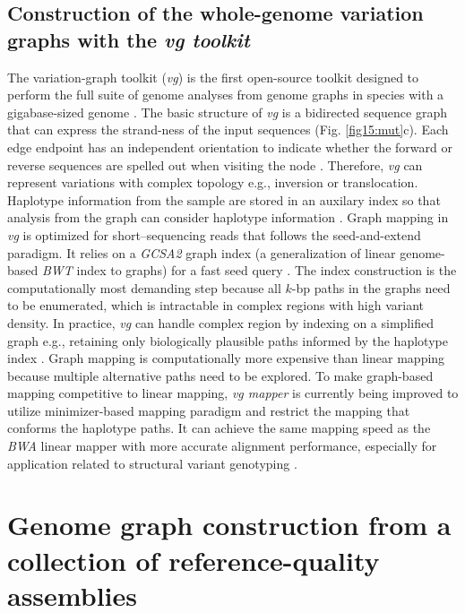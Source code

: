 \documentclass[../main.tex]{subfiles}
\begin{document}
\subsection{Construction of the whole-genome variation graphs with the \emph{vg toolkit}}

The variation-graph toolkit (\emph{vg}) is the first open-source toolkit designed to perform the full suite of genome analyses from genome graphs in species with a gigabase-sized genome \citep{garrison2018variation}. The basic structure of \emph{vg} is a bidirected sequence graph that can express the strand-ness of the input sequences (Fig. \ref{fig15:mut}c). Each edge endpoint has an independent orientation to indicate whether the forward or reverse sequences are spelled out when visiting the node \citep{paten2017genome}. Therefore, \emph{vg} can represent variations with complex topology e.g., inversion or translocation. Haplotype information from the sample are stored in an auxilary index so that analysis from the graph can consider haplotype information \citep{siren2020haplotype}. Graph mapping in \emph{ vg} is optimized for short–sequencing reads that follows the seed-and-extend paradigm. It relies on a \emph{GCSA2 }graph index (a generalization of linear genome-based\emph{ BWT} index to graphs) for a fast seed query \citep{siren2017indexing}. The index construction is the computationally most demanding step because all $k$-bp paths in the graphs need to be enumerated, which is intractable in complex regions with high variant density. In practice, \emph{vg} can handle complex region by indexing on a simplified graph e.g., retaining only biologically plausible paths informed by the haplotype index \citep{siren2017indexing}. Graph mapping is computationally more expensive than linear mapping because multiple alternative paths need to be explored. To make graph-based mapping competitive to linear mapping, \emph{vg mapper} is currently being improved to utilize minimizer-based mapping paradigm and restrict the mapping that conforms the haplotype paths. It can achieve the same mapping speed as the \emph{BWA} linear mapper with more accurate alignment performance, especially for application related to structural variant genotyping \citep{siren2020genotyping}. 

\section[Construction of the multi-assembly graphs]{Genome graph construction from a collection of reference-quality assemblies}
\end{document}
